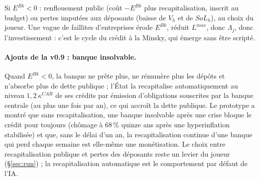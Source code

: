 \documentclass[11pt,a4paper]{article}
\begin{document}
Si $E^{Bk} < 0$ : renflouement public (coût $-E^{Bk}$ plus recapitalisation, inscrit au budget) ou pertes imputées aux déposants (baisse de $V_h$ et de $SoL_h$), au choix du joueur.
Une vague de faillites d'entreprises érode $E^{Bk}$, réduit $L^{max}$, donc $\Lambda_j$, donc l'investissement : c'est le cycle du crédit à la Minsky, qui émerge sans être scripté.

\paragraph{Ajouts de la v0.9 : banque insolvable.} Quand $E^{Bk}<0$, la banque ne prête plus, ne rémunère plus les dépôts et n'absorbe plus de dette publique ; l'État la recapitalise automatiquement au niveau $1{,}2\,\kappa^{CAR}$ de ses crédits par émission d'obligations souscrites par la banque centrale (au plus une fois par an), ce qui accroît la dette publique. Le prototype a montré que sans recapitalisation, une banque insolvable après une crise bloque le crédit pour toujours (chômage à 68\,\% quinze ans après une hyperinflation stabilisée) et que, sans le délai d'un an, la recapitalisation continue d'une banque qui perd chaque semaine est elle-même une monétisation. Le choix entre recapitalisation publique et pertes des déposants reste un levier du joueur (\S\ref{sec:run}) ; la recapitalisation automatique est le comportement par défaut de l'IA.
\end{document}
